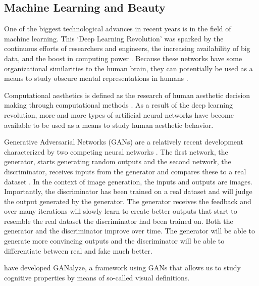 \documentclass[../main.tex]{subfiles}
\begin{document}
\subsection{Machine Learning and Beauty}
One of the biggest technological advances in recent years is in the field of machine learning. This `Deep Learning Revolution' was sparked by the continuous efforts of researchers and engineers, the increasing availability of big data, and the boost in computing power \parencite{sejnowskiDeepLearningRevolution2018}. Because these networks have some organizational similarities to the human brain, they can potentially be used as a means to study obscure mental representations in humans \parencite{guoDeepLearningVisual2016, goetschalckx2021generative}. 

Computational aesthetics is defined as the research of human aesthetic decision making through computational methods \parencite{valenziseAdvancesChallengesComputational2022, hoenig2005proceedings}. As a result of the deep learning revolution, more and more types of artificial neural networks have become available to be used as a means to study human aesthetic behavior.

Generative Adversarial Networks (GANs) are a relatively recent development characterized by two competing neural networks \parencite{goodfellow2014generative}. The first network, the generator, starts generating random outputs and the second network, the discriminator, receives inputs from the generator and compares these to a real dataset \parencite{creswellGenerativeAdversarialNetworks2018}. In the context of image generation, the inputs and outputs are images. Importantly, the discriminator has been trained on a real dataset and will judge the output generated by the generator. The generator receives the feedback and over many iterations will slowly learn to create better outputs that start to resemble the real dataset the discriminator had been trained on. Both the generator and the discriminator improve over time. The generator will be able to generate more convincing outputs and the discriminator will be able to differentiate between real and fake much better.


\textcite{goetschalckxGANalyzeVisualDefinitions2019} have developed GANalyze, a framework using GANs that allows us to study cognitive properties by means of so-called visual definitions.
\end{document}
